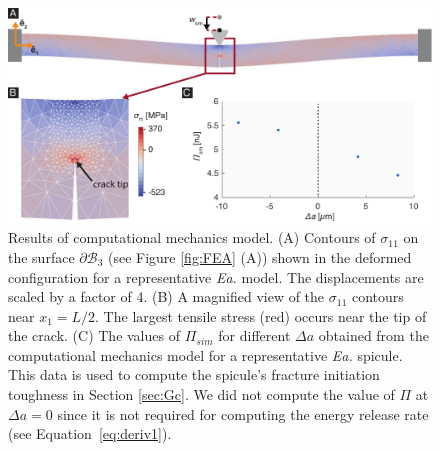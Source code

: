 \documentclass[12pt,onecolumn]{article}
\makeatletter
\newcommand{\EA}{\textit{Ea.\@}\xspace}
\makeatother
\begin{document}
\begin{bibunit}
	\begin{figure}[H]
	\centering
	\includegraphics[width=\textwidth]{../Figures/FigureFEA2/FigureA3_V1.pdf}
	\caption{Results of computational mechanics model. (A) Contours of $\sigma_{11}$ on the surface $\partial \mathcal{B}_3$ (see Figure \ref{fig:FEA} (A)) shown in the deformed configuration for a representative \EA model. The displacements are scaled by a factor of 4. (B) A magnified view of the $\sigma_{11}$ contours near $x_1=L/2$. The largest tensile stress (red) occurs near the tip of the crack. (C) The values of $\Pi_{sim}$ for different $\Delta a$ obtained from the computational mechanics model for a representative \EA spicule. This data is used to compute the spicule's fracture initiation toughness in Section \ref{sec:Gc}. We did not compute the value of $\Pi$ at $\Delta a=0$ since it is not required for computing the energy release rate (see Equation~\eqref{eq:deriv1}).}
	\label{fig:FEA2}
	\end{figure}

\singlespacing
\putbib[refs]
\end{bibunit} 
 
 
 
\end{document}
